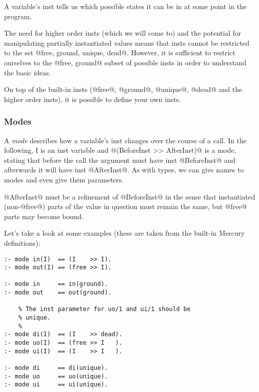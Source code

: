 A variable's inst tells us which possible states it can be
in at some point in the program.

The need for higher order insts (which we will come to)
and the potential for manipulating partially instantiated
values means that insts cannot be restricted to the set
@{free, ground, unique, dead}@.  However, it is sufficient
to restrict ourselves to the @{free, ground}@ subset of
possible insts in order to understand the basic ideas.


On top of the built-in insts (@free@, @ground@, @unique@, @dead@
and the higher order insts), it is possible to define your
own insts.  

\subsubsection{Modes}

A \emph{mode} describes how a variable's inst changes over the
course of a call.  In the following, I is an inst
variable and @(BeforeInst >> AfterInst)@ is a mode, stating
that before the call the argument must have inst
@BeforeInst@ and afterwards it will have inst @AfterInst@.  As
with types, we can give names to modes and even give them
parameters.

@AfterInst@ must be a refinement of @BeforeInst@ in the sense
that instantiated (\ie non-@free@) parts of the value in
question must remain the same, but @free@ parts may become
bound.  

Let's take a look at some examples (these are taken from
the built-in Mercury definitions):
\begin{verbatim}
:- mode in(I)  == (I    >> I).
:- mode out(I) == (free >> I).

:- mode in     == in(ground).
:- mode out    == out(ground).

    % The inst parameter for uo/1 and ui/1 should be
    % unique.
    %
:- mode di(I)  == (I    >> dead).
:- mode uo(I)  == (free >> I   ).
:- mode ui(I)  == (I    >> I   ).

:- mode di     == di(unique).
:- mode uo     == uo(unique).
:- mode ui     == ui(unique).
\end{verbatim}

